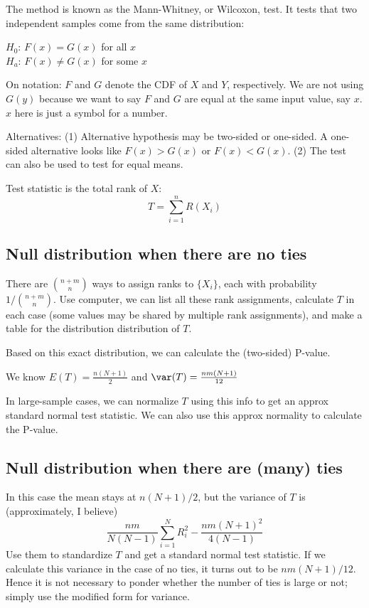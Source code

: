 \documentclass[12pt]{article}
\begin{document}
The method is known as the Mann-Whitney, or Wilcoxon, test.
It tests that two independent samples come from the same distribution:

$H_0$: $F(x) = G(x)$ for all $x$\\
$H_a$: $F(x) \ne G(x)$ for some $x$

\alert On notation: $F$ and $G$ denote the CDF of $X$ and $Y$,
respectively. We are not using $G(y)$ because we want to say
$F$ and $G$ are equal at the same input value, say $x$. $x$ here is just
a symbol for a number.

\alert Alternatives:
(1) Alternative hypothesis may be two-sided or one-sided.
A one-sided alternative looks like
$F(x) > G(x)$ or $F(x) < G(x)$.
(2) The test can also be used to test for equal means.

Test statistic is the total rank of $X$:
\[
T = \sum_{i=1}^n R(X_i)
\]

\subsection{Null distribution when there are no ties}

There are ${n+m}\choose n$ ways to assign ranks to $\{X_i\}$,
each with probability $1/{{n+m}\choose n}$.
Use computer, we can list all these rank assignments, calculate $T$ in
each case (some values may be shared by multiple rank assignments),
and make a table for the distribution distribution of $T$.

Based on this exact distribution, we can calculate the (two-sided)
P-value.

We know
$E(T) = \frac{n(N+1)}{2}$ and
$\var(T) = \frac{nm(N+1)}{12}$

In large-sample cases, we can normalize $T$ using this info
to get an approx standard normal test statistic.
We can also use this approx normality to calculate the P-value.

\subsection{Null distribution when there are (many) ties}

In this case the mean stays at $n(N+1)/2$,
but the variance of $T$ is (approximately, I believe)
\[
\frac{nm}{N(N-1)}\sum_{i=1}^N R_i^2 - \frac{nm(N+1)^2}{4(N-1)}
\]
Use them to standardize $T$ and get a standard normal test statistic.
If we calculate this variance in the case of no ties,
it turns out to be $nm(N+1)/12$.
Hence it is not necessary to ponder whether the number of ties is large
or not; simply use the modified form for variance.
\end{document}
